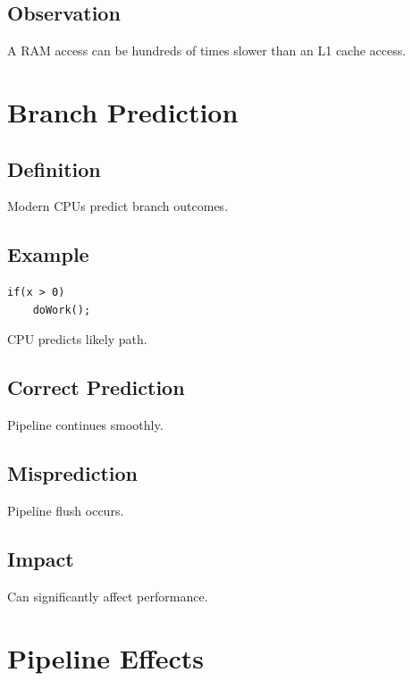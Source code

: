 \subsection{Observation}

A RAM access can be hundreds of times slower than an L1 cache access.

\section{Branch Prediction}

\subsection{Definition}

Modern CPUs predict branch outcomes.

\subsection{Example}

\begin{verbatim}
if(x > 0)
    doWork();
\end{verbatim}

CPU predicts likely path.

\subsection{Correct Prediction}

Pipeline continues smoothly.

\subsection{Misprediction}

Pipeline flush occurs.

\subsection{Impact}

Can significantly affect performance.

\section{Pipeline Effects}

